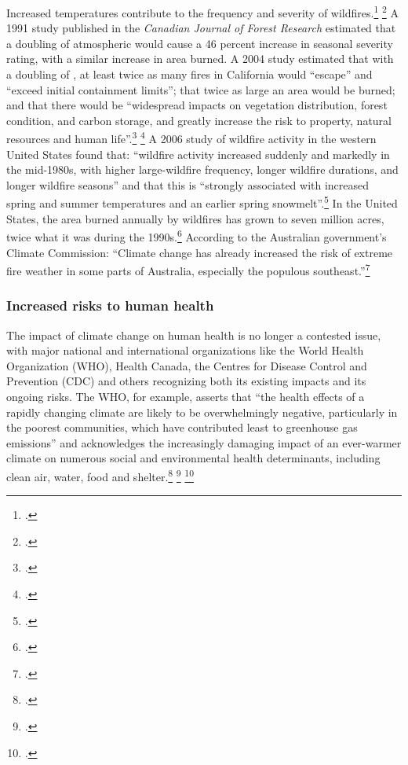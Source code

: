 Increased temperatures contribute to the frequency and severity of wildfires.\footcite[][p. 33, 48, 50, 51, 53, 65 ]{IPCCar4_syr} \footcite[See also: ][]{UCSWildfire}
A 1991 study published in the \emph{Canadian Journal of Forest Research} estimated that a doubling of atmospheric  would cause a 46 percent increase in seasonal severity rating, with a similar increase in area burned.
A 2004 study estimated that with a doubling of , at least twice as many fires in California would ``escape'' and ``exceed initial containment limits''; that twice as large an area would be burned; and that there would be ``widespread impacts on vegetation distribution, forest condition, and carbon storage, and greatly increase the risk to property, natural resources and human life''.\footcite[][p. 169]{FriedWildfire} \footcite[See also: ][]{WesterlingWildfire}
A 2006 study of wildfire activity in the western United States found that: ``wildfire activity increased suddenly and markedly in the mid-1980s, with higher large-wildfire frequency, longer wildfire durations, and longer wildfire seasons'' and that this is ``strongly associated with increased spring and summer temperatures and an earlier spring snowmelt''.\footcite[][p. 940--943]{Westerling2006}
In the United States, the area burned annually by wildfires has grown to seven million acres, twice what it was during the 1990s.\footcite[][]{NYTFireNewNormal}
According to the Australian government's Climate Commission: ``Climate change has already increased the risk of extreme fire weather in some parts of Australia, especially the populous southeast.''\footcite[][p. 4]{CriticalDecade2013}



	\subsubsection{Increased risks to human health}



The impact of climate change on human health is no longer a contested issue, with major national and international organizations like the World Health Organization (WHO), Health Canada, the Centres for Disease Control and Prevention (CDC) and others recognizing both its existing impacts and its ongoing risks. 
The WHO, for example, asserts that ``the health effects of a rapidly changing climate are likely to be overwhelmingly negative, particularly in the poorest communities, which have contributed least to greenhouse gas emissions'' and acknowledges the increasingly damaging impact of an ever-warmer climate on numerous social and environmental health determinants, including clean air, water, food and shelter.\footcite[][]{WHOClimateHealth} \footcite[See also: ][]{LancetCCHealth} \footcite[See also: ][p. 811-7]{RacialEthnicHeat}



